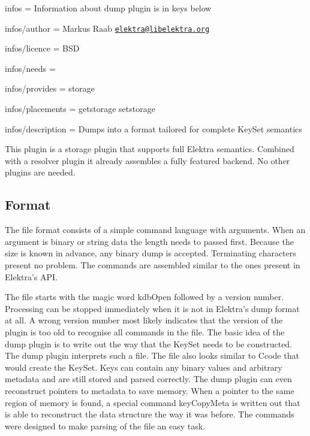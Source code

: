 
\begin{DoxyItemize}
\item infos = Information about dump plugin is in keys below
\item infos/author = Markus Raab \href{mailto:elektra@libelektra.org}{\tt elektra@libelektra.\+org}
\item infos/licence = B\+S\+D
\item infos/needs =
\item infos/provides = storage
\item infos/placements = getstorage setstorage
\item infos/description = Dumps into a format tailored for complete Key\+Set semantics
\end{DoxyItemize}

This plugin is a storage plugin that supports full Elektra semantics. Combined with a resolver plugin it already assembles a fully featured backend. No other plugins are needed.

\subsection*{Format}

The file format consists of a simple command language with arguments. When an argument is binary or string data the length needs to passed first. Because the size is known in advance, any binary dump is accepted. Terminating characters present no problem. The commands are assembled similar to the ones present in Elektra’s A\+P\+I.

The file starts with the magic word {\ttfamily kdb\+Open} followed by a version number. Processing can be stopped immediately when it is not in Elektra’s dump format at all. A wrong version number most likely indicates that the version of the plugin is too old to recognise all commands in the file. The basic idea of the dump plugin is to write out the way that the Key\+Set needs to be constructed. The dump plugin interprets such a file. The file also looks similar to Ccode that would create the Key\+Set. Keys can contain any binary values and arbitrary metadata and are still stored and parsed correctly. The dump plugin can even reconstruct pointers to metadata to save memory. When a pointer to the same region of memory is found, a special command {\ttfamily key\+Copy\+Meta} is written out that is able to reconstruct the data structure the way it was before. The commands were designed to make parsing of the file an easy task.

